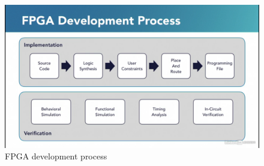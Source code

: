 \begin{figure}[H]
	\begin{center}
		\includegraphics[width=\textwidth]{images/FPGADevelop.png}
		\caption{FPGA development process}
		\label{FPGADevelopment}
	\end{center}
\end{figure}

